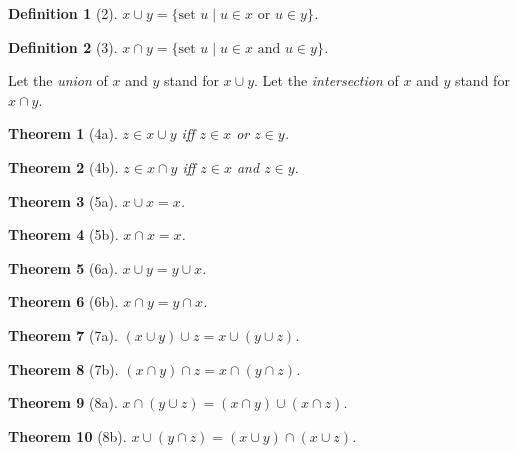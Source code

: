\documentclass{scrartcl}
\newenvironment{forthel}{\begin{leftbar}}{\end{leftbar}}
\newtheorem*{theorem}{Theorem}
\newtheorem*{definition}{Definition}
\begin{document}
\begin{forthel}

\begin{definition}[2] $x \cup y = \{\text{set } u \mid u \in x \text{ or } u \in y \}$.
\end{definition}

\begin{definition}[3] $x \cap y = \{\text{set } u \mid u \in x \text{ and } u \in y \}$.
\end{definition}

Let the \emph{union} of $x$ and $y$ stand for $x \cup y$.
Let the \emph{intersection} of $x$ and $y$ stand for $x \cap y$.

\begin{theorem}[4a] $z \in x \cup y$ iff $z \in x$ or $z \in y$.
\end{theorem}

\begin{theorem}[4b] $z \in x \cap y$ iff $z \in x$ and $z \in y$.
\end{theorem}

\begin{theorem}[5a] $x \cup x = x$.
\end{theorem}

\begin{theorem}[5b] $x \cap x = x$.
\end{theorem}

\begin{theorem}[6a] $x \cup y = y \cup x$.
\end{theorem}

\begin{theorem}[6b] $x \cap y = y \cap x$.
\end{theorem}

\begin{theorem}[7a] $(x \cup y) \cup z = x \cup (y \cup z)$.
\end{theorem}

\begin{theorem}[7b] $(x \cap y) \cap z = x \cap (y \cap z)$.
\end{theorem}

\begin{theorem}[8a] $x \cap (y \cup z) = (x \cap y) \cup (x \cap z)$.
\end{theorem}

\begin{theorem}[8b] $x \cup (y \cap z) = (x \cup y) \cap (x \cup z)$.
\end{theorem}


\end{forthel}
\end{document}
